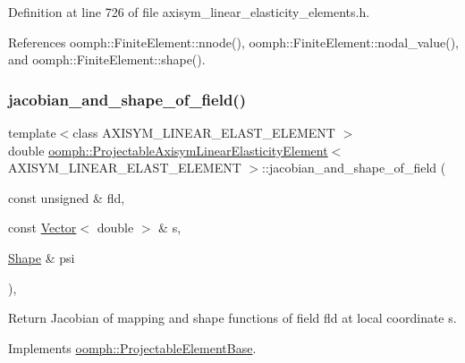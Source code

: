 Definition at line 726 of file axisym\+\_\+linear\+\_\+elasticity\+\_\+elements.\+h.



References oomph\+::\+Finite\+Element\+::nnode(), oomph\+::\+Finite\+Element\+::nodal\+\_\+value(), and oomph\+::\+Finite\+Element\+::shape().

\mbox{\label{classoomph_1_1ProjectableAxisymLinearElasticityElement_a86f342760e932e4ae53f0fe36d784bd0}} 
\subsubsection{\texorpdfstring{jacobian\+\_\+and\+\_\+shape\+\_\+of\+\_\+field()}{jacobian\_and\_shape\_of\_field()}}
{\footnotesize\ttfamily template$<$class A\+X\+I\+S\+Y\+M\+\_\+\+L\+I\+N\+E\+A\+R\+\_\+\+E\+L\+A\+S\+T\+\_\+\+E\+L\+E\+M\+E\+NT $>$ \\
double \hyperlink{classoomph_1_1ProjectableAxisymLinearElasticityElement}{oomph\+::\+Projectable\+Axisym\+Linear\+Elasticity\+Element}$<$ A\+X\+I\+S\+Y\+M\+\_\+\+L\+I\+N\+E\+A\+R\+\_\+\+E\+L\+A\+S\+T\+\_\+\+E\+L\+E\+M\+E\+NT $>$\+::jacobian\+\_\+and\+\_\+shape\+\_\+of\+\_\+field (\begin{DoxyParamCaption}\item[{const unsigned \&}]{fld,  }\item[{const \hyperlink{classoomph_1_1Vector}{Vector}$<$ double $>$ \&}]{s,  }\item[{\hyperlink{classoomph_1_1Shape}{Shape} \&}]{psi }\end{DoxyParamCaption})\hspace{0.3cm}{\ttfamily [inline]}, {\ttfamily [virtual]}}



Return Jacobian of mapping and shape functions of field fld at local coordinate s. 



Implements \hyperlink{classoomph_1_1ProjectableElementBase_ad45c21b58c0985d52f68ab2d79cbb488}{oomph\+::\+Projectable\+Element\+Base}.




